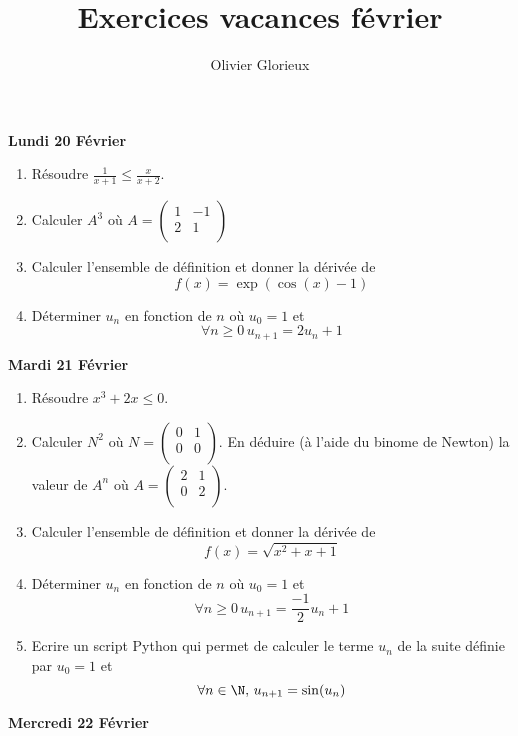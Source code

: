 \documentclass[a4paper, 11pt,reqno]{article}
\author{Olivier Glorieux}
\begin{document}
\title{Exercices vacances février}
\vspace{0,5cm}

\begin{center}
\textbf{Lundi 20 Février }
\end{center}
\begin{enumerate}
\item Résoudre $\frac{1}{x+1}\leq \frac{x}{x+2}$.
\item Calculer $A^3$ où $A=\begin{pmatrix}
1&-1\\
2&1\\
\end{pmatrix}$
\item Calculer l'ensemble de définition et donner la dérivée de $$f(x) =\exp(\cos(x)-1)$$
\item Déterminer $u_n$ en fonction de $n$ où $u_0=1$ et 
$$\forall n \geq 0\, u_{n+1} =2u_n+1$$
\end{enumerate}

\begin{center}
\textbf{Mardi 21 Février }
\end{center}

\begin{enumerate}
\item Résoudre $x^3+2x\leq 0$.
\item Calculer $N^2$ où $N=\begin{pmatrix}
0&1\\
0&0\\
\end{pmatrix}$. En déduire (à l'aide du binome de Newton) la valeur de $A^n$ où $A=\begin{pmatrix}
2&1\\
0&2\\
\end{pmatrix}$. 
\item Calculer l'ensemble de définition et donner la dérivée de $$f(x) =\sqrt{x^2+x+1}$$
\item Déterminer $u_n$ en fonction de $n$ où $u_0=1$ et 
$$\forall n \geq 0\, u_{n+1} =\frac{-1}{2}u_n+1$$

\item Ecrire un script Python qui permet de calculer le terme $u_n$ de la suite définie par $u_0=1$ et 
$$\forall n \in \N, \, u_{n+1} = \sin(u_n)$$
\end{enumerate}



\begin{center}
\textbf{Mercredi 22 Février }
\end{center}
\end{document}
